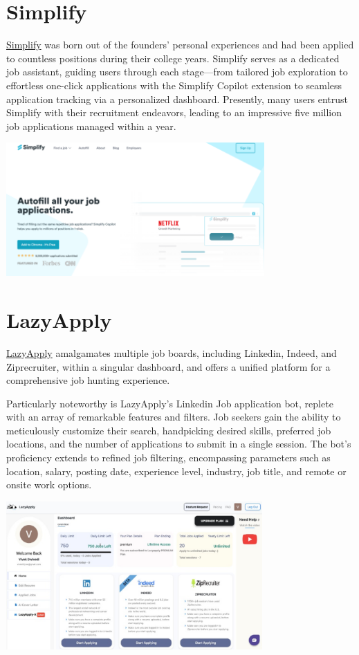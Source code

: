 \documentclass[
]{book}
\begin{document}
\hypertarget{simplify}{%
\section{Simplify}\label{simplify}}

\href{https://simplify.jobs/autofill\#how-it-works}{Simplify} was born out of the founders' personal experiences and had been applied to countless positions during their college years. Simplify serves as a dedicated job assistant, guiding users through each stage---from tailored job exploration to effortless one-click applications with the Simplify Copilot extension to seamless application tracking via a personalized dashboard. Presently, many users entrust Simplify with their recruitment endeavors, leading to an impressive five million job applications managed within a year.~

\includegraphics[width=3.88542in,height=\textheight]{simplify pic.png}

\hypertarget{lazyapply-1}{%
\section{LazyApply}\label{lazyapply-1}}

\href{https://lazyapply.com/}{LazyApply} amalgamates multiple job boards, including Linkedin, Indeed, and Ziprecruiter, within a singular dashboard, and offers a unified platform for a comprehensive job hunting experience.

Particularly noteworthy is LazyApply's Linkedin Job application bot, replete with an array of remarkable features and filters. Job seekers gain the ability to meticulously customize their search, handpicking desired skills, preferred job locations, and the number of applications to submit in a single session. The bot's proficiency extends to refined job filtering, encompassing parameters such as location, salary, posting date, experience level, industry, job title, and remote or onsite work options.~

\includegraphics[width=3.85417in,height=\textheight]{lazyapply pic 2.png}
\end{document}
